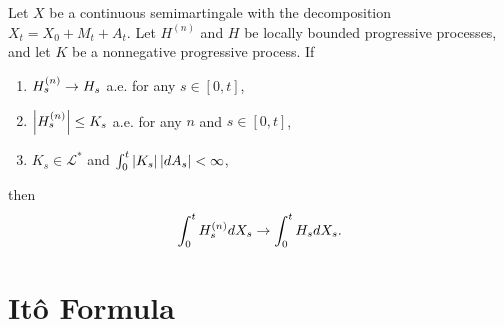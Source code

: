 \begin{thm}[DCT]
    Let $X$ be a continuous semimartingale with the decomposition $X_t = X_0 + M_t+ A_t$. Let $H^{(n)}$ and $H$ be locally bounded progressive processes, and let $K$ be a nonnegative progressive process. If
    \begin{enumerate}[label=(\roman*)]
        \item $H_s^{(n)} \rightarrow H_s$ a.e. for any $s \in [0,t]$,
        \item $\left\lvert H^{(n)}_s\right\lvert \leq K_s$ a.e. for any $n$ and $s \in [0,t]$,
        \item $K_s \in \mathcal{L}^*$ and $\int_0^t\left\lvert K_s\right\lvert\left\lvert dA_s\right\lvert < \infty$,
    \end{enumerate}
    then
    \begin{equation*}
        \int_0^t H_s^{(n)} dX_s \rightarrow \int_0^t H_s dX_s.
    \end{equation*}
\end{thm}

\section{It\^o Formula}

